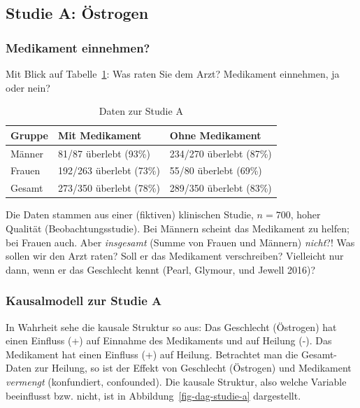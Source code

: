 \documentclass[
  a4paper,
  DIV=11]{scrreprt}
\theoremstyle{definition}
\theoremstyle{remark}
\begin{document}
\hypertarget{studie-a-uxf6strogen}{%
\subsection{Studie A: Östrogen}\label{studie-a-uxf6strogen}}

\hypertarget{medikament-einnehmen}{%
\subsubsection{Medikament einnehmen?}\label{medikament-einnehmen}}

Mit Blick auf Tabelle~\ref{tbl-studie-a}: Was raten Sie dem Arzt?
Medikament einnehmen, ja oder nein?

\hypertarget{tbl-studie-a}{}
\begin{longtable}{lll}
\caption{\label{tbl-studie-a}Daten zur Studie A }\tabularnewline

\toprule
Gruppe & Mit Medikament & Ohne Medikament \\ 
\midrule
Männer & 81/87 überlebt (93\%) & 234/270 überlebt (87\%) \\ 
Frauen & 192/263 überlebt (73\%) & 55/80 überlebt (69\%) \\ 
Gesamt & 273/350 überlebt (78\%) & 289/350 überlebt (83\%) \\ 
\bottomrule
\end{longtable}

Die Daten stammen aus einer (fiktiven) klinischen Studie, \(n=700\),
hoher Qualität (Beobachtungsstudie). Bei Männern scheint das Medikament
zu helfen; bei Frauen auch. Aber \emph{insgesamt} (Summe von Frauen und
Männern) \emph{nicht}?! Was sollen wir den Arzt raten? Soll er das
Medikament verschreiben? Vielleicht nur dann, wenn er das Geschlecht
kennt (Pearl, Glymour, und Jewell 2016)?

\hypertarget{kausalmodell-zur-studie-a}{%
\subsubsection{Kausalmodell zur Studie
A}\label{kausalmodell-zur-studie-a}}

In Wahrheit sehe die kausale Struktur so aus: Das Geschlecht (Östrogen)
hat einen Einfluss (+) auf Einnahme des Medikaments und auf Heilung (-).
Das Medikament hat einen Einfluss (+) auf Heilung. Betrachtet man die
Gesamt-Daten zur Heilung, so ist der Effekt von Geschlecht (Östrogen)
und Medikament \emph{vermengt} (konfundiert, confounded). Die kausale
Struktur, also welche Variable beeinflusst bzw. nicht, ist in
Abbildung~\ref{fig-dag-studie-a} dargestellt.
\end{document}
